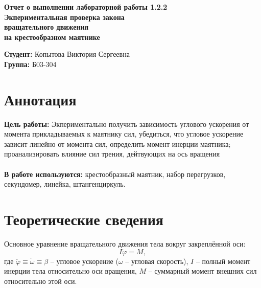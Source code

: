 \documentclass[a4paper,12pt]{article}
\begin{document}
    \begin{titlepage}
    \begin{center}
        \vspace{4cm}
        \huge {\textbf{Отчет о выполнении лабораторной работы 1.2.2}}
        {} \\
        \vspace{1cm}
        \Large {\textbf{Экпериментальная проверка закона}} \\
        \Large {\textbf{вращательного движения}} \\
        \Large {\textbf{на крестообразном маятнике}} \\

        \vspace{10cm}
        \begin{flushright}
        \begin{minipage}{.45\textwidth}
        \normalsize{\textbf{Студент:} Копытова Виктория Сергеевна}\\
        \textbf{Группа:} Б03-304\\
        \end{minipage}
        \end{flushright}

        
    \end{center}
    \end{titlepage}
	\newpage






\section {Аннотация}
\textbf{Цель работы:} Экпериментально получить зависимость углового ускорения от момента прикладываемых к маятнику сил, убедиться, что угловое ускорение зависит линейно от момента сил, определить момент инерции маятника; проанализировать влияние сил трения, дейтвующих на ось вращения\\
\\
\textbf{В работе используются:} крестообразный маятник, набор перегрузков, секундомер, линейка, штангенциркуль.
\\


\section{Теоретические сведения}
Основное уравнение вращательного движения тела вокруг закреплённой оси:
\begin{equation}\label{1}
I \ddot{\varphi} = M, 
\end{equation}
где $\ddot{\varphi} \equiv \dot{\omega} \equiv \beta$ -- угловое ускорение ($\omega$  -- угловая скорость), $I$ -- полный момент инерции тела относительно оси вращения, $M$ -- суммарный момент внешних сил относительно этой оси.
\end{document}
